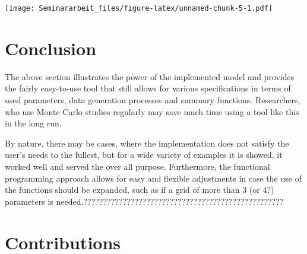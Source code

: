 \documentclass[11pt,a4paper]{article}
\newenvironment{Shaded}{\begin{snugshade}}{\end{snugshade}}
\newcommand{\AttributeTok}[1]{\textcolor[rgb]{0.77,0.63,0.00}{#1}}
\newcommand{\FunctionTok}[1]{\textcolor[rgb]{0.00,0.00,0.00}{#1}}
\newcommand{\NormalTok}[1]{#1}
\newcommand{\OtherTok}[1]{\textcolor[rgb]{0.56,0.35,0.01}{#1}}
\newcommand{\SpecialCharTok}[1]{\textcolor[rgb]{0.00,0.00,0.00}{#1}}
\newcommand{\StringTok}[1]{\textcolor[rgb]{0.31,0.60,0.02}{#1}}
\begin{document}
\begin{Shaded}
\end{Shaded}

\texttt{[image: Seminararbeit\_files/figure-latex/unnamed-chunk-5-1.pdf]}

\pagebreak

\hypertarget{conclusion}{%
\section{Conclusion}\label{conclusion}}

The above section illustrates the power of the implemented model and
provides the fairly easy-to-use tool that still allows for various
specifications in terms of used parameters, data generation processes
and summary functions. Researchers, who use Monte Carlo studies
regularly may save much time using a tool like this in the long run.

By nature, there may be cases, where the implementation does not satisfy
the user's needs to the fullest, but for a wide variety of examples it
is showed, it worked well and served the over all purpose. Furthermore,
the functional programming approach allows for easy and flexible
adjustments in case the use of the functions should be expanded, such as
if a grid of more than 3 (or 4?) parameters is
needed.???????????????????????????????????????????????????


\pagebreak

\hypertarget{contributions}{%
\section{Contributions}\label{contributions}}
\end{document}
